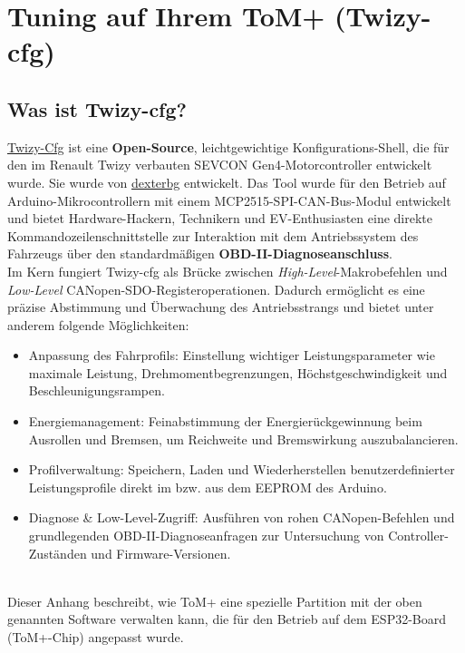 \appendix
\chapter{Tuning auf Ihrem ToM+ (Twizy-cfg)}
\label{apx:tuning}

\section{Was ist Twizy-cfg?}

\href{http://github.com/dexterbg/Twizy-Cfg}{Twizy-Cfg} ist eine \textbf{Open-Source}, leichtgewichtige Konfigurations-Shell, die für den im Renault Twizy verbauten SEVCON
Gen4-Motorcontroller entwickelt wurde. Sie wurde von \href{https://github.com/dexterbg}{dexterbg} entwickelt.
Das Tool wurde für den Betrieb auf Arduino-Mikrocontrollern mit einem MCP2515-SPI-CAN-Bus-Modul entwickelt
und bietet Hardware-Hackern, Technikern und EV-Enthusiasten eine direkte
Kommandozeilenschnittstelle zur Interaktion mit dem Antriebssystem des Fahrzeugs über den standardmäßigen
\textbf{OBD-II-Diagnoseanschluss}.\\

Im Kern fungiert Twizy-cfg als Brücke zwischen \textit{High-Level}-Makrobefehlen und \textit{Low-Level}
CANopen-SDO-Registeroperationen. Dadurch ermöglicht es eine präzise Abstimmung und
Überwachung des Antriebsstrangs und bietet unter anderem folgende Möglichkeiten:\\

\begin{itemize}
    \item Anpassung des Fahrprofils: Einstellung wichtiger Leistungsparameter wie maximale Leistung, Drehmomentbegrenzungen, Höchstgeschwindigkeit und Beschleunigungsrampen.
    \item Energiemanagement: Feinabstimmung der Energierückgewinnung beim Ausrollen und Bremsen, um Reichweite und Bremswirkung auszubalancieren.
    \item Profilverwaltung: Speichern, Laden und Wiederherstellen benutzerdefinierter Leistungsprofile direkt im bzw. aus dem EEPROM des Arduino.
    \item Diagnose \& Low-Level-Zugriff: Ausführen von rohen CANopen-Befehlen und grundlegenden OBD-II-Diagnoseanfragen zur Untersuchung von Controller-Zuständen und Firmware-Versionen.
\end{itemize}
\  \\
Dieser Anhang beschreibt, wie ToM+ eine spezielle Partition mit der oben genannten
Software verwalten kann, die für den Betrieb auf dem ESP32-Board (ToM+-Chip) angepasst wurde.


